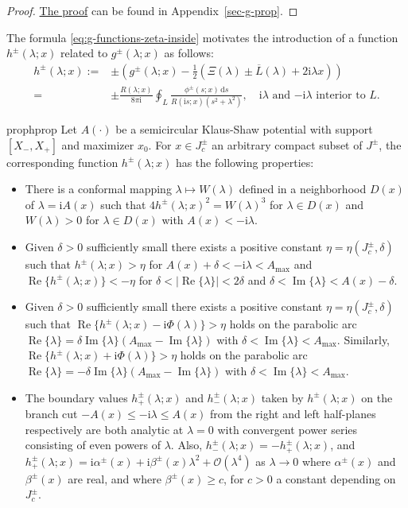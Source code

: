 \documentclass[12pt]{amsart}
\numberwithin{equation}{section}
\newcommand{\dd}{\mathrm{d}}
\newcommand{\ii}{\mathrm{i}}
\newcommand{\SP}{\lambda}
\newcommand{\phaseint}{\Phi}
\newcommand{\tailint}{\Xi}
\newcommand{\bigo}[1]{ \mathcal{O}\! \left( #1 \right) }
\DeclareMathOperator{\imag}{Im}
\DeclareMathOperator{\re}{Re}
\begin{document}
\begin{proof}
\hyperlink{proof-g-prop}{The proof} can be found in Appendix~\ref{sec-g-prop}.
\end{proof}
The formula \eqref{eq:g-functions-zeta-inside} motivates the introduction of a function $h^\pm(\SP;x)$ related to $g^\pm(\SP;x)$ as follows:
\begin{equation}
\begin{split}
h^\pm(\SP;x):=&\pm\left(g^\pm(\SP;x)-\frac{1}{2}(\tailint(\SP)\pm\overline{L}(\SP)+2\ii\SP x)\right)\\
{}=&\pm\frac{R(\SP;x)}{8\pi \ii}\oint_L\frac{\phi^\pm(s;x)\,\dd s}{R(\ii s;x)(s^2+\SP^2)},\quad
\text{$\ii\SP$ and $-\ii\SP$ interior to $L$}.
\end{split}
\label{eq:h-def-zeta}
\end{equation}
\begin{restatable}{prop}{hprop}
Let $A(\cdot)$ be a semicircular Klaus-Shaw potential with support $[X_-,X_+]$ and maximizer $x_0$. For $x \in J^\pm_c$ an arbitrary compact subset of $J^\pm$, the corresponding function $h^\pm(\SP;x)$ has the following properties:
\begin{itemize}
\item[H1:] There is a conformal mapping $\SP\mapsto W(\SP)$ defined in a neighborhood $D(x)$ of $\SP=\ii A(x)$ such that $4h^\pm(\SP;x)^2=W(\SP)^3$ for $\SP\in D(x)$ and $W(\SP)>0$ for $\SP\in D(x)$ with $A(x)<-\ii\SP$.
\item[H2:] Given $\delta>0$ sufficiently small there exists a positive constant $\eta=\eta(J_c^\pm,\delta)$ such that
$h^\pm(\SP;x)>\eta$ for $A(x)+\delta<-\ii\SP<A_\mathrm{max}$ and
$\re\{h^\pm(\SP;x)\}<-\eta$ for $\delta<|\re\{\SP\}|<2\delta$ and $\delta<\imag\{\SP\}<A(x)-\delta$.  
\item[H3:] Given $\delta>0$ sufficiently small there exists a positive constant $\eta=\eta(J^\pm_c,\delta)$ such that $\re\{h^\pm(\SP;x)- \ii\phaseint(\SP)\}>\eta$ holds on the parabolic arc 
$\re\{\SP\}=\delta\imag\{\SP\}(A_\mathrm{max}-\imag\{\SP\})$ with $\delta<\imag\{\SP\}<A_\mathrm{max}$.
Similarly, $\re\{h^\pm(\SP;x)+\ii\phaseint(\SP)\}>\eta$ holds on the parabolic arc 
$\re\{\SP\}=-\delta\imag\{\SP\}(A_\mathrm{max}-\imag\{\SP\})$ with $\delta<\imag\{\SP\}<A_\mathrm{max}$.
\item[H4:] The boundary values $h^\pm_+(\SP;x)$ and $h^\pm_-(\SP;x)$ taken by $h^\pm(\SP;x)$ on the branch cut $-A(x)\le -\ii\SP\le A(x)$ from the right and left half-planes respectively are both analytic at $\SP=0$ with convergent power series consisting of even powers of $\SP$.  Also, $h^\pm_-(\SP;x)=-h^\pm_+(\SP;x)$, and $h^\pm_+(\SP;x)=\ii\alpha^\pm(x) + \ii\beta^\pm(x)\SP^2 + \bigo{\SP^4}$ as $\SP\to 0$ where $\alpha^\pm(x)$ and $\beta^\pm(x)$ are real, and where $\beta^\pm(x) \geq c$, for $c >0$ a constant depending on $J_c^\pm$.

\end{itemize}
\end{restatable}
\end{document}
